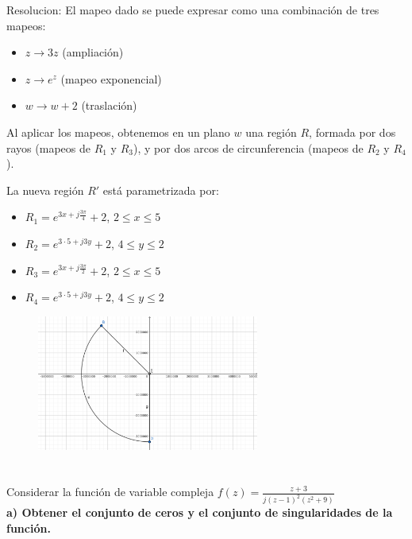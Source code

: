 \documentclass[12pt]{report}
\begin{document}
Resolucion:
El mapeo dado se puede expresar como una combinación de tres mapeos:

\begin{itemize}
    \item $z \rightarrow 3z$ (ampliación)
    \item $z \rightarrow e^z$ (mapeo exponencial)
    \item $w \rightarrow w + 2$ (traslación)
\end{itemize}

Al aplicar los mapeos, obtenemos en un plano $w$ una región $R$, formada por dos rayos (mapeos de $R_1$ y $R_3$), y por dos arcos de circunferencia (mapeos de $R_2$ y $R_4$).

La nueva región $R'$ está parametrizada por:
\begin{itemize}
    \item $R_1 = e^{3x+j\frac{3\pi}{4}} + 2$, $2 \leq x \leq 5$
    \item $R_2 = e^{3 \cdot 5+j3y} + 2$, $4 \leq y \leq 2$
    \item $R_3 = e^{3x+j\frac{3\pi}{2}} + 2$, $2 \leq x \leq 5$
    \item $R_4 = e^{3 \cdot 5+j3y} + 2$, $4 \leq y \leq 2$
\end{itemize}


\begin{figure}[h] %
    \centering %
    \includegraphics[width=0.65\textwidth]{./Imagenes/foto2Ej4.png} %
\end{figure}

\chapter{}

Considerar la función de variable compleja $f(z) =\frac{z + 3}{j(z - 1)^2(z^2 + 9)}$\\[6pt]

\textbf{a) Obtener el conjunto de ceros y el conjunto de singularidades de la función.}\\[6pt]
\end{document}
